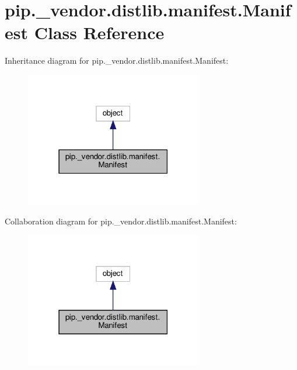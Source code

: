 \hypertarget{classpip_1_1__vendor_1_1distlib_1_1manifest_1_1Manifest}{}\section{pip.\+\_\+vendor.\+distlib.\+manifest.\+Manifest Class Reference}
\label{classpip_1_1__vendor_1_1distlib_1_1manifest_1_1Manifest}


Inheritance diagram for pip.\+\_\+vendor.\+distlib.\+manifest.\+Manifest\+:
\nopagebreak
\begin{figure}[H]
\begin{center}
\leavevmode
\includegraphics[width=219pt]{classpip_1_1__vendor_1_1distlib_1_1manifest_1_1Manifest__inherit__graph}
\end{center}
\end{figure}


Collaboration diagram for pip.\+\_\+vendor.\+distlib.\+manifest.\+Manifest\+:
\nopagebreak
\begin{figure}[H]
\begin{center}
\leavevmode
\includegraphics[width=219pt]{classpip_1_1__vendor_1_1distlib_1_1manifest_1_1Manifest__coll__graph}
\end{center}
\end{figure}

